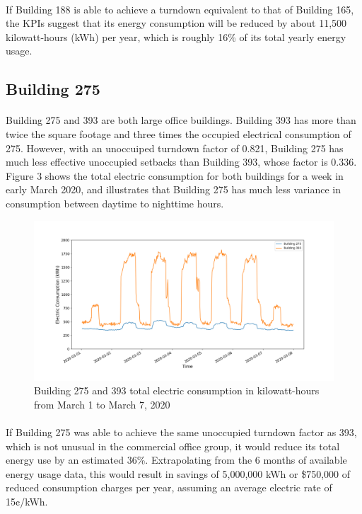 \documentclass[a4paper]{article}
\begin{document}
\paragraph{}
If Building 188 is able to achieve a turndown equivalent to that of Building 165, the KPIs suggest that its energy consumption will be reduced by about 11,500 kilowatt-hours (kWh) per year, which is roughly 16\% of its total yearly energy usage.

\subsection{Building 275}

\paragraph{}
Building 275 and 393 are both large office buildings. Building 393 has more than twice the square footage and three times the occupied electrical consumption of 275. However, with an unoccuiped turndown factor of 0.821, Building 275 has much less effective unoccupied setbacks than Building 393, whose factor is 0.336. Figure 3 shows the total electric consumption for both buildings for a week in early March 2020, and illustrates that Building 275 has much less variance in consumption between daytime to nighttime hours.

\begin{figure}[H]
\centering
\includegraphics[width=.9\columnwidth]{./images/275v393_Turndown.png}
\caption{Building 275 and 393 total electric consumption in kilowatt-hours from March 1 to March 7, 2020}
\end{figure}

\paragraph{}
If Building 275 was able to achieve the same unoccupied turndown factor as 393, which is not unusual in the commercial office group, it would reduce its total energy use by an estimated 36\%. Extrapolating from the 6 months of available energy usage data, this would result in savings of 5,000,000 kWh or \$750,000 of reduced consumption charges per year, assuming an average electric rate of 15¢/kWh.
\end{document}
